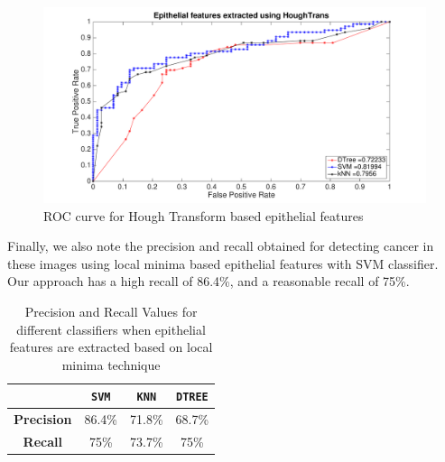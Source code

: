 \begin{figure}
\includegraphics[scale=0.2]{figs/ROC_circleConv.pdf}
\caption{\label{fig:ROC_circleConv}ROC curve for Hough Transform based  epithelial features}
\end{figure} 



Finally, we also note the precision and recall obtained for detecting cancer in these images using local minima based epithelial features with SVM classifier. Our approach has a high recall of 86.4\%, and a reasonable recall of 75\%.

\begin{table}
\centering
\begin{tabular}{|c|c|c|c| }
\hline
 & \textbf{\texttt{SVM}} & \textbf{\texttt{KNN}} & \textbf{\texttt{DTREE}} \\ \hline
\textbf{Precision} & 86.4\% & 71.8\% & 68.7\% \\ \hline
\textbf{Recall} & 75\% & 73.7\%  & 75\% \\ \hline
\end{tabular}
\caption{\label{table:PrecisionRecall}Precision and Recall Values for different classifiers when epithelial features are extracted based on local minima technique}
\end{table}